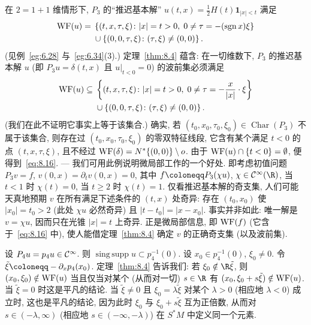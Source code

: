 \begin{example}\label{eg:8.6}
在 $2 = 1 + 1$ 维情形下, $P_3$ 的``推迟基本解'' $u(t, x) = \frac{1}{2}H(t)\mathbf{1}_{|x| < t}$ 满足
\begin{equation}\label{eq:8.15}
    \begin{aligned}
        \operatorname{WF}(u) ={} & \left\{ (t, x, \tau, \xi) \colon | x | = t > 0, \; 0 \neq \tau = -(\operatorname{sgn} x)\xi \right\} \\
        & \cup \left\{ (0, 0, \tau, \xi) \colon (\tau, \xi) \neq (0, 0) \right\}.
    \end{aligned}
\end{equation}
(见例~\ref{eg:6.28} 与~\ref{eg:6.34}(3).) 定理~\ref{thm:8.4} 蕴含: 在一切维数下, $P_3$ 的推迟基本解 $u$ (即 $P_3 u = \delta(t, x)$ 且 $u|_{t<0} = 0$) 的波前集必须满足
\begin{equation}\label{eq:8.16}
    \begin{aligned}
        \operatorname{WF}(u) \subseteq{} & \left\{ (t, x, \tau, \xi) \colon | x | = t > 0, \; 0 \neq \tau = -\frac{x}{|x|} \cdot \xi \right\} \\
        & \cup \left\{ (0, 0, \tau, \xi) \colon (\tau, \xi) \neq (0, 0) \right\}.
    \end{aligned}
\end{equation}
(我们在此不证明它事实上等于该集合.) 确实, 若 $(t_0, x_0, \tau_0, \xi_0) \in \operatorname{Char}(P_3)$ 不属于该集合, 则存在过 $(t_0, x_0, \tau_0, \xi_0)$ 的零双特征线段, 它含有某个满足 $t < 0$ 的点 $(t, x, \tau, \xi)$, 且不经过 $\operatorname{WF}(\delta) = N^*\{(0, 0)\} \setminus o$. 由于 $\operatorname{WF}(u) \cap \{t < 0\} = \emptyset$, 便得到~\eqref{eq:8.16}. --- 我们可用此例说明微局部工作的一个好处. 即考虑初值问题 $P_3 v = f$, $v(0, x) = \partial_t v(0, x) = 0$, 其中 $f \defeq P_3(\chi u)$, $\chi \in \Smooth(\R)$, 当 $t < 1$ 时 $\chi(t) = 0$, 当 $t \ge 2$ 时 $\chi(t) = 1$. 仅看推迟基本解的奇支集, 人们可能天真地预期 $v$ 在所有满足下述条件的 $(t, x)$ 处奇异: 存在 $(t_0, x_0)$ 使 $| x_0 | = t_0 > 2$ (此处 $\chi u$ 必然奇异) 且 $| t - t_0 | = | x - x_0 |$. 事实并非如此: 唯一解是 $v = \chi u$, 因而只在光锥 $| x | = t$ 上奇异. 正是微局部信息, 即 $\operatorname{WF}(f)$ (它含于~\eqref{eq:8.16} 中), 使人能借定理~\ref{thm:8.4} 确定 $v$ 的正确奇支集 (以及波前集).
\end{example}

\begin{example}\label{eg:8.7}
设 $P_4 u = p_4 u \in \mathcal{C}^\infty$. 则 $\operatorname{sing\,supp} u \subset p_4^{-1}(0)$. 设 $x_0 \in p_4^{-1}(0)$, $\xi_0 \neq 0$. 令 $\tilde{\xi} \defeq -\partial_x p_4(x_0)$. 定理~\ref{thm:8.4} 告诉我们: 若 $\xi_0 \notin \R\tilde{\xi}$, 则 $(x_0, \xi_0) \notin \operatorname{WF}(u)$ 当且仅当对某个 (从而对一切) $s \in \R$ 有 $(x_0, \xi_0 + s\tilde{\xi}) \notin \operatorname{WF}(u)$. 当 $\tilde{\xi} = 0$ 时这是平凡的结论. 当 $\tilde{\xi} \neq 0$ 且 $\xi_0 = \lambda\tilde{\xi}$ 对某个 $\lambda > 0$ (相应地 $\lambda < 0$) 成立时, 这也是平凡的结论, 因为此时 $\xi_0$ 与 $\xi_0 + s\tilde{\xi}$ 互为正倍数, 从而对 $s \in (-\lambda, \infty)$ (相应地 $s \in (-\infty, -\lambda)$) 在 $S^*M$ 中定义同一个元素.
\end{example}

